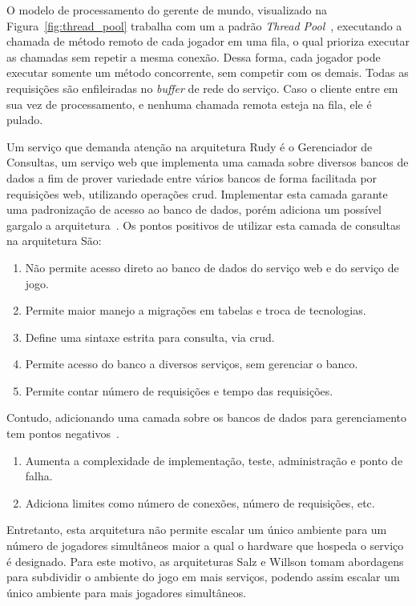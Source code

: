 O modelo de processamento do gerente de mundo, visualizado na Figura~\ref{fig:thread_pool} trabalha com um a padrão \textit{Thread Pool}~\cite{Ringler2014Dec, matthiasrudy2011}, executando a chamada de método remoto de cada jogador em uma fila, o qual prioriza executar as chamadas sem repetir a mesma conexão.
%
Dessa forma, cada jogador pode executar somente um método concorrente, sem competir com os demais. Todas as requisições são enfileiradas no \textit{buffer} de rede do serviço.
%
Caso o cliente entre em sua vez de processamento, e nenhuma chamada remota esteja na fila, ele é pulado.



Um serviço que demanda atenção na arquitetura Rudy é o Gerenciador de Consultas, um serviço web que implementa uma camada sobre diversos bancos de dados a fim de prover variedade entre vários bancos de forma facilitada por requisições web, utilizando operações \ac{crud}.
%
Implementar esta camada garante uma padronização de acesso ao banco de dados, porém adiciona um possível gargalo a arquitetura~\cite{matthiasrudy2011}.
%
Os pontos positivos de utilizar esta camada de consultas na arquitetura São:
\begin{enumerate}
  \item Não permite acesso direto ao banco de dados do serviço web e do serviço de jogo.
  \item Permite maior manejo a migrações em tabelas e troca de tecnologias.
  \item Define uma sintaxe estrita para consulta, via \ac{crud}.
  \item Permite acesso do banco a diversos serviços, sem gerenciar o banco.
  \item Permite contar número de requisições e tempo das requisições.
\end{enumerate}



Contudo, adicionando uma camada sobre os bancos de dados para gerenciamento tem pontos negativos~\cite{matthiasrudy2011}.

\begin{enumerate}
  \item Aumenta a complexidade de implementação, teste, administração e ponto de falha.
  \item Adiciona limites como número de conexões, número de requisições, etc.
\end{enumerate}

Entretanto, esta arquitetura não permite escalar um único ambiente para um número de jogadores simultâneos maior a qual o hardware que hospeda o serviço é designado.
%
Para este motivo, as arquiteturas Salz e Willson tomam abordagens para subdividir o ambiente do jogo em mais serviços, podendo assim escalar um único ambiente para mais jogadores simultâneos.


